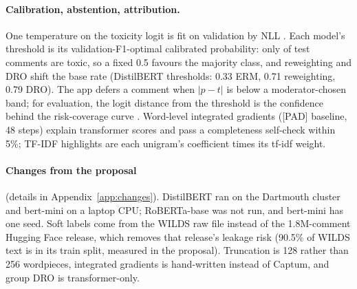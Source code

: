 \documentclass[11pt]{article}
\begin{document}
\paragraph{Calibration, abstention, attribution.} One temperature on the toxicity logit is fit on validation by NLL
\citep{guo2017calibration}. Each model's threshold is its validation-F1-optimal calibrated probability: only
\ToxicShare{} of test comments are toxic, so a fixed 0.5 favours the majority class, and reweighting and DRO shift the
base rate (DistilBERT thresholds: 0.33 ERM, 0.71 reweighting, 0.79 DRO). The app defers a comment when $|p-t|$ is
below a moderator-chosen band; for evaluation, the logit distance from the threshold is the confidence behind the
risk-coverage curve \citep{geifman2017selective}. Word-level integrated gradients \citep{sundararajan2017axiomatic}
([PAD] baseline, 48 steps) explain transformer scores and pass a completeness self-check within 5\%; TF-IDF
highlights are each unigram's coefficient times its tf-idf weight.

\paragraph{Changes from the proposal} (details in Appendix~\ref{app:changes}). DistilBERT ran on the Dartmouth
cluster and bert-mini on a laptop CPU; RoBERTa-base was not run, and bert-mini has one seed. Soft labels come from the
WILDS raw file instead of the 1.8M-comment Hugging Face release, which removes that release's leakage risk (90.5\% of
WILDS text is in its train split, measured in the proposal). Truncation is 128 rather than 256 wordpieces, integrated
gradients is hand-written instead of Captum, and group DRO is transformer-only.






\end{document}
